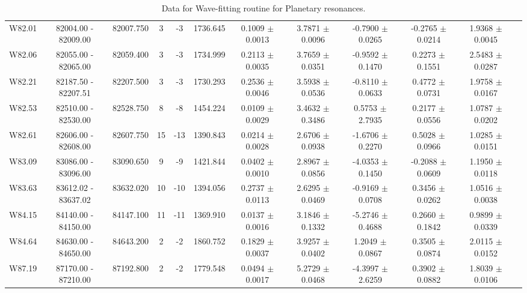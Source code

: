 \documentclass{article}
\begin{document}
\begin{table}[h]
{\begin{tabular}{|c|c|c|c|c|c|c|c|c|c|c|c|}
W82.01 & 82004.00 - 82009.00 & 82007.750 & 3 & -3 & 1736.645 & 0.1009 $\pm$ 0.0013 & 3.7871 $\pm$ 0.0096 &   -0.7900 $\pm$ 0.0265 & -0.2765 $\pm$ 0.0214 & 1.9368 $\pm$ 0.0045 \\
         
W82.06 & 82055.00 - 82065.00 & 82059.400 & 3 & -3 & 1734.999 & 0.2113 $\pm$ 0.0035 & 3.7659 $\pm$ 0.0351 &  -0.9592 $\pm$ 0.1470 & 0.2273 $\pm$ 0.1551 & 2.5483 $\pm$ 0.0287 \\

W82.21 & 82187.50 - 82207.51 & 82207.500 & 3 & -3 & 1730.293 & 0.2536 $\pm$ 0.0046 & 3.5938 $\pm$ 0.0536 &  -0.8110 $\pm$ 0.0633 & 0.4772 $\pm$ 0.0731 & 1.9758 $\pm$ 0.0167 \\

W82.53 & 82510.00 - 82530.00 & 82528.750 & 8 & -8 & 1454.224 & 0.0109 $\pm$ 0.0029 & 3.4632 $\pm$ 0.3486 &  0.5753 $\pm$ 2.7935 & 0.2177 $\pm$ 0.0556 & 1.0787 $\pm$ 0.0202 \\

W82.61 & 82606.00 - 82608.00 & 82607.750 & 15 & -13 & 1390.843 & 0.0214 $\pm$ 0.0028 & 2.6706 $\pm$ 0.0938 &  -1.6706 $\pm$ 0.2270 & 0.5028 $\pm$ 0.0966 & 1.0285 $\pm$ 0.0151 \\
         
W83.09 & 83086.00 - 83096.00 & 83090.650 & 9 & -9 & 1421.844 & 0.0402 $\pm$ 0.0010 & 2.8967 $\pm$ 0.0856 &  -4.0353 $\pm$ 0.1450 & -0.2088 $\pm$ 0.0609 & 1.1950 $\pm$ 0.0118 \\

W83.63 & 83612.02 - 83637.02 & 83632.020 & 10 & -10 & 1394.056 & 0.2737 $\pm$ 0.0113 & 2.6295 $\pm$ 0.0469 & -0.9169 $\pm$ 0.0708 & 0.3456 $\pm$ 0.0262 & 1.0516 $\pm$ 0.0038 \\

W84.15 & 84140.00 - 84150.00 & 84147.100 & 11 & -11 & 1369.910 & 0.0137 $\pm$ 0.0016 & 3.1846 $\pm$ 0.1332 & -5.2746 $\pm$ 0.4688 & 0.2660 $\pm$ 0.1842 & 0.9899 $\pm$ 0.0339 \\

W84.64 & 84630.00 - 84650.00 & 84643.200 & 2 & -2 & 1860.752 & 0.1829 $\pm$ 0.0037 & 3.9257 $\pm$ 0.0402 &  1.2049 $\pm$ 0.0867 & 0.3505 $\pm$ 0.0874 & 2.0115 $\pm$ 0.0152 \\

W87.19 & 87170.00 - 87210.00 & 87192.800 & 2 & -2 & 1779.548 & 0.0494 $\pm$ 0.0017 & 5.2729 $\pm$ 0.0468 & -4.3997 $\pm$ 2.6259 & 0.3902 $\pm$ 0.0882 & 1.8039 $\pm$ 0.0106 \\

\hline
\end{tabular}
\vspace{-1.5cm} %
}
\caption{Data for Wave-fitting routine for Planetary resonances.}
\end{table}
\end{document}
